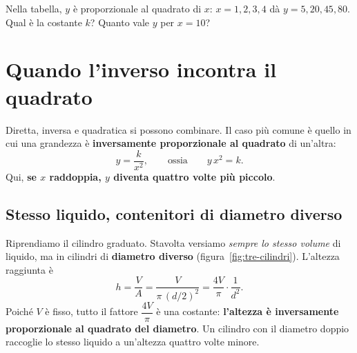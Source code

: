 \begin{esercizio}
Nella tabella, $y$ è proporzionale al quadrato di $x$: $x = 1,2,3,4$ dà $y = 5,20,45,80$. Qual è la costante $k$? Quanto vale $y$ per $x = 10$?\\
\end{esercizio}

\section{Quando l'inverso incontra il quadrato}

Diretta, inversa e quadratica si possono combinare. Il caso più comune è quello in cui una grandezza è \textbf{inversamente proporzionale al quadrato} di un'altra:
\[ y = \frac{k}{x^2}, \qquad\text{ossia}\qquad y\,x^2 = k. \]
Qui, \textbf{se $x$ raddoppia, $y$ diventa quattro volte più piccolo}.

\subsection{Stesso liquido, contenitori di diametro diverso}
Riprendiamo il cilindro graduato. Stavolta versiamo \emph{sempre lo stesso volume} di liquido, ma in cilindri di \textbf{diametro diverso} (figura~\ref{fig:tre-cilindri}). L'altezza raggiunta è
\[ h = \frac{V}{A} = \frac{V}{\pi\,(d/2)^2} = \frac{4V}{\pi}\cdot\frac{1}{d^2}. \]
Poiché $V$ è fisso, tutto il fattore $\dfrac{4V}{\pi}$ è una costante: \textbf{l'altezza è inversamente proporzionale al quadrato del diametro}. Un cilindro con il diametro doppio raccoglie lo stesso liquido a un'altezza quattro volte minore.

